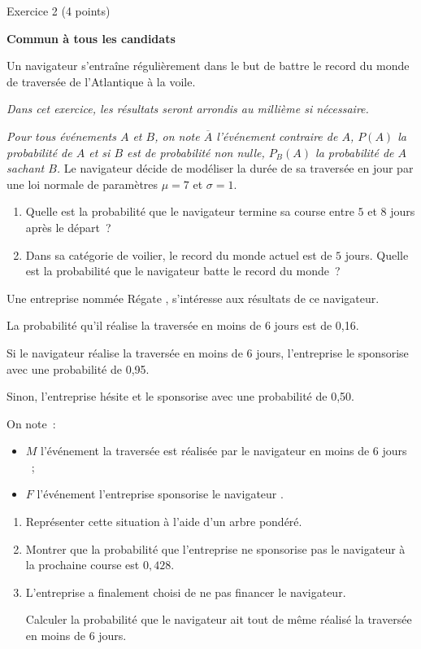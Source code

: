 
%
\begin{h2}Exercice 2 (4 points)\end{h2}
\par
\textbf{Commun  à tous les candidats}
\par
Un navigateur s'entraîne régulièrement dans le but de battre le record du monde de
traversée de l'Atlantique à la voile.
\par
\emph{Dans cet exercice, les résultats seront arrondis au millième si nécessaire.}
\par
\emph{Pour tous événements $A$ et $B$, on note $\overline{A}$ l'événement contraire de $A$, $P(A)$ la probabilité de $A$
et si $B$ est de probabilité non nulle, $P_B(A)$ la probabilité de $A$ sachant $B$.}
\medbreak
{}
\medbreak
Le navigateur décide de modéliser la durée de sa traversée en jour par une loi normale de
paramètres $\mu = 7$ et $\sigma= 1$.
\medbreak
\begin{enumerate}
     \item Quelle est la probabilité que le navigateur termine sa course entre $5$ et $8$ jours après le départ~?
     \item Dans sa catégorie de voilier, le record du monde actuel est de $5$ jours.
     Quelle est la probabilité que le navigateur batte le record du monde~?
\end{enumerate}
\medbreak
{}
\medbreak
Une entreprise nommée \og Régate \fg, s'intéresse aux résultats de ce navigateur.
\par
La probabilité qu'il réalise la traversée en moins de 6 jours est de 0,16.
\par
Si le navigateur réalise la traversée en moins de 6 jours, l'entreprise le sponsorise avec une probabilité de 0,95.
\par
Sinon, l'entreprise hésite et le sponsorise avec une probabilité de 0,50.
\par
On note~:
\begin{itemize}
     \item $M$ l'événement \og la traversée est réalisée par le navigateur en moins de 6 jours \fg~;
     \item $F$ l'événement \og l'entreprise sponsorise le navigateur \fg.
\end{itemize}
\begin{enumerate}
     \item Représenter cette situation à l'aide d'un arbre pondéré.
     \item  Montrer que la probabilité que l'entreprise ne sponsorise pas le navigateur à la
     prochaine course est $0,428$.
     \item  L'entreprise a finalement choisi de ne pas financer le navigateur.
     \par
     Calculer la probabilité que le navigateur ait tout de même réalisé la traversée en moins
     de $6$ jours.
\end{enumerate}
